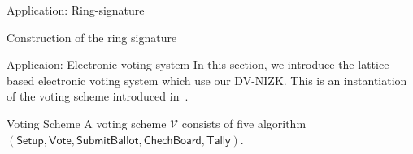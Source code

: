 \begin{section}{Application: Ring-signature}
\begin{subsection}{Construction of the ring signature}
  \end{subsection}
\end{section}

\begin{section}{Applicaion: Electronic voting system}
  In this section, we introduce the lattice based electronic voting system which use our DV-NIZK.
  This is an instantiation of the voting scheme introduced in~\cite{DBLP:conf/pkc/ChaidosG15}.

  \begin{definition}{Voting Scheme}
    A voting scheme $\mathcal{V}$ consists of five algorithm $(\mathsf{Setup}, \mathsf{Vote}, \mathsf{SubmitBallot}, \mathsf{ChechBoard}, \mathsf{Tally})$.
  \end{definition}



\end{section}
